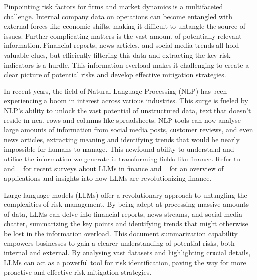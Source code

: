 %

Pinpointing risk factors for firms and market dynamics is a multifaceted challenge.
Internal company data on operations can become entangled with external forces like economic shifts, making it difficult
to untangle the source of issues.
Further complicating matters is the vast amount of potentially relevant information.
Financial reports, news articles, and social media trends all hold valuable clues, but efficiently filtering this data
and extracting the key risk indicators is a hurdle.
This information overload makes it challenging to create a clear picture of potential risks and develop effective
mitigation strategies.

In recent years, the field of Natural Language Processing (NLP) has been experiencing a boom in interest across various
industries.
This surge is fueled by NLP's ability to unlock the vast potential of unstructured data, text that doesn't reside in
neat rows and columns like spreadsheets.
NLP tools can now analyse large amounts of information from social media posts, customer reviews, and even news
articles, extracting meaning and identifying trends that would be nearly impossible for humans to manage.
This newfound ability to understand and utilise the information we generate is transforming fields like finance.
Refer to ~\cite{Lee2024} and ~\cite{Li2023} for recent surveys about LLMs in finance and ~\cite{Zhao2024} for an overview
of applications and insights into how LLMs are revolutionizing finance.

Large language models (LLMs) offer a revolutionary approach to untangling the complexities of risk management.
By being adept at processing massive amounts of data, LLMs can delve into financial reports, news streams, and social
media chatter, summarizing the key points and identifying trends that might otherwise be lost in the information
overload.
This document summarization capability empowers businesses to gain a clearer understanding of potential risks, both
internal and external.
By analysing vast datasets and highlighting crucial details, LLMs can act as a powerful tool for risk identification,
paving the way for more proactive and effective risk mitigation strategies.


